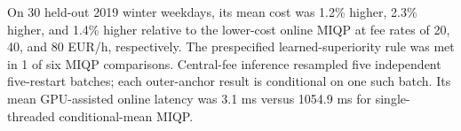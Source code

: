 On 30 held-out 2019 winter weekdays, its mean cost was 1.2\% higher, 2.3\% higher, and 1.4\% higher relative to the lower-cost online MIQP at fee rates of 20, 40, and 80 EUR/h, respectively. The prespecified learned-superiority rule was met in 1 of six MIQP comparisons. Central-fee inference resampled five independent five-restart batches; each outer-anchor result is conditional on one such batch. Its mean GPU-assisted online latency was 3.1 ms versus 1054.9 ms for single-threaded conditional-mean MIQP.